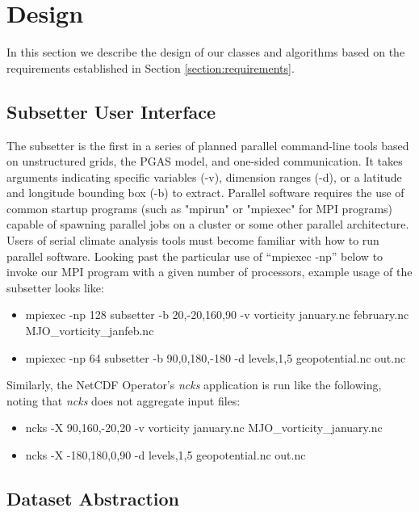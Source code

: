 \section{Design}
\label{section:design}

In this section we describe the design of our classes and algorithms based on
the requirements established in Section \ref{section:requirements}.

\subsection{Subsetter User Interface}

The subsetter is the first in a series of planned parallel command-line tools
based on unstructured grids, the PGAS model, and one-sided communication.  It
takes arguments indicating specific variables (-v), dimension ranges (-d), or
a latitude and longitude bounding box (-b) to extract.  Parallel software
requires the use of common startup programs (such as "mpirun" or "mpiexec" for
MPI programs) capable of spawning parallel jobs on a cluster or some other
parallel architecture.  Users of serial climate analysis tools must become
familiar with how to run parallel software.  Looking past the particular use
of ``mpiexec -np'' below to invoke our MPI program with a given number of
processors, example usage of the subsetter looks like:

\begin{itemize}
\item mpiexec -np 128 subsetter -b 20,-20,160,90 -v vorticity january.nc february.nc MJO\_vorticity\_janfeb.nc
\item mpiexec -np 64 subsetter -b 90,0,180,-180 -d levels,1,5 geopotential.nc out.nc
\end{itemize}

Similarly, the NetCDF Operator's \emph{ncks} application\cite{NCO} is run
like the following, noting that \emph{ncks} does not aggregate input files:

\begin{itemize}
\item ncks -X 90,160,-20,20 -v vorticity january.nc MJO\_vorticity\_january.nc
\item ncks -X -180,180,0,90 -d levels,1,5 geopotential.nc out.nc
\end{itemize}

\subsection{Dataset Abstraction}


